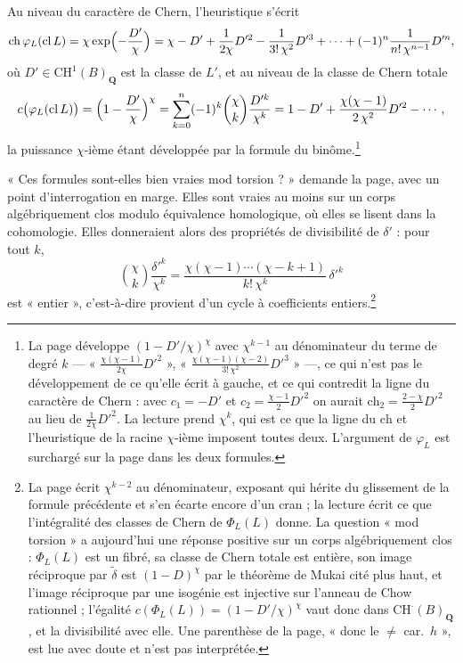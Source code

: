 \documentclass[11pt,a4paper]{article}
\begin{document}
Au niveau du caractère de Chern, l'heuristique s'écrit
\[
  \mathrm{ch}\,\varphi_L(\mathrm{cl}\,L)
  = \chi \exp\Bigl(-\frac{D'}{\chi}\Bigr)
  = \chi - D' + \frac{1}{2\chi}D'^{2} - \frac{1}{3!\,\chi^{2}}D'^{3} + \cdots
  + (-1)^n\frac{1}{n!\,\chi^{n-1}}D'^{n},
\]
où $D' \in \mathrm{CH}^{1}(B)_{\mathbf{Q}}$ est la classe de $L'$, et au
niveau de la classe de Chern totale
\[
  c\bigl(\varphi_L(\mathrm{cl}\,L)\bigr)
  = \Bigl(1 - \frac{D'}{\chi}\Bigr)^{\chi}
  = \sum_{k=0}^{n} (-1)^{k}\binom{\chi}{k}\frac{D'^{k}}{\chi^{k}}
  = 1 - D' + \frac{\chi(\chi-1)}{2\,\chi^{2}}D'^{2} - \cdots,
\]
la puissance $\chi$-ième étant développée par la formule du
binôme.\footnote{La page développe $(1 - D'/\chi)^{\chi}$ avec
$\chi^{k-1}$ au dénominateur du terme de degré $k$ — « $\frac{\chi(\chi-1)}
{2\chi}D'^{2}$ », « $\frac{\chi(\chi-1)(\chi-2)}{3!\,\chi^{2}}D'^{3}$ » —,
ce qui n'est pas le développement de ce qu'elle écrit à gauche, et ce qui
contredit la ligne du caractère de Chern : avec $c_1 = -D'$ et $c_2 =
\frac{\chi-1}{2}D'^{2}$ on aurait $\mathrm{ch}_2 = \frac{2-\chi}{2}D'^{2}$
au lieu de $\frac{1}{2\chi}D'^{2}$. La lecture prend $\chi^{k}$, qui est ce que
la ligne du $\mathrm{ch}$ et l'heuristique de la racine $\chi$-ième imposent
toutes deux. L'argument de $\varphi_L$ est surchargé sur la page dans les deux
formules.}

« Ces formules sont-elles bien vraies mod torsion ? » demande la page, avec
un point d'interrogation en marge. Elles sont vraies au moins sur un corps
algébriquement clos modulo équivalence homologique, où elles se lisent dans
la cohomologie. Elles donneraient alors des propriétés de divisibilité de
$\delta'$ : pour tout $k$,
\[
  \binom{\chi}{k}\frac{\delta'^{k}}{\chi^{k}}
  = \frac{\chi(\chi-1)\cdots(\chi-k+1)}{k!\,\chi^{k}}\,\delta'^{k}
\]
est « entier », c'est-à-dire provient d'un cycle à coefficients
entiers.\footnote{La page écrit $\chi^{k-2}$ au dénominateur, exposant qui
hérite du glissement de la formule précédente et s'en écarte encore d'un
cran ; la lecture écrit ce que l'intégralité des classes de Chern de
$\Phi_L(L)$ donne. La question « mod torsion » a aujourd'hui une réponse
positive sur un corps algébriquement clos : $\Phi_L(L)$ est un fibré, sa
classe de Chern totale est entière, son image réciproque par $\tilde\delta$
est $(1 - D)^{\chi}$ par le théorème de Mukai cité plus haut, et l'image
réciproque par une isogénie est injective sur l'anneau de Chow rationnel ;
l'égalité $c(\Phi_L(L)) = (1 - D'/\chi)^{\chi}$ vaut donc dans
$\mathrm{CH}^{\cdot}(B)_{\mathbf{Q}}$, et la divisibilité avec elle. Une
parenthèse de la page, « donc le $\neq$ car.\ $h$ », est lue avec doute et
n'est pas interprétée.}
\end{document}
